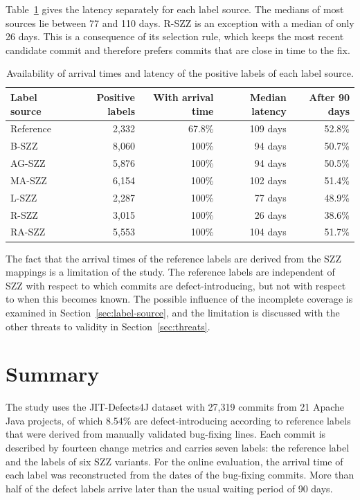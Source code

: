 \documentclass[12pt,a4paper,oneside]{report}
\begin{document}
Table~\ref{tab:latency-source} gives the latency separately for each label
source. The medians of most sources lie between 77 and 110 days. R-SZZ is an
exception with a median of only 26 days. This is a consequence of its
selection rule, which keeps the most recent candidate commit and therefore
prefers commits that are close in time to the fix.

\begin{table}[htbp]
\centering\small
\caption{Availability of arrival times and latency of the positive labels of
each label source.}
\label{tab:latency-source}
\begin{tabular}{@{}lrrrr@{}}
\toprule
Label source & Positive labels & With arrival time & Median latency & After 90 days \\
\midrule
Reference & 2,332 & 67.8\% & 109 days & 52.8\% \\
B-SZZ & 8,060 & 100\% & 94 days & 50.7\% \\
AG-SZZ & 5,876 & 100\% & 94 days & 50.5\% \\
MA-SZZ & 6,154 & 100\% & 102 days & 51.4\% \\
L-SZZ & 2,287 & 100\% & 77 days & 48.9\% \\
R-SZZ & 3,015 & 100\% & 26 days & 38.6\% \\
RA-SZZ & 5,553 & 100\% & 104 days & 51.7\% \\
\bottomrule
\end{tabular}
\end{table}

The fact that the arrival times of the reference labels are derived from the
SZZ mappings is a limitation of the study. The reference labels are
independent of SZZ with respect to which commits are defect-introducing, but
not with respect to when this becomes known. The possible influence of the
incomplete coverage is examined in Section~\ref{sec:label-source}, and the
limitation is discussed with the other threats to validity in
Section~\ref{sec:threats}.

\section{Summary}

The study uses the JIT-Defects4J dataset with 27,319 commits from 21 Apache
Java projects, of which 8.54\% are defect-introducing according to reference
labels that were derived from manually validated bug-fixing lines. Each commit
is described by fourteen change metrics and carries seven labels: the
reference label and the labels of six SZZ variants. For the online
evaluation, the arrival time of each label was reconstructed from the dates
of the bug-fixing commits. More than half of the defect labels arrive later
than the usual waiting period of 90 days.
\end{document}
